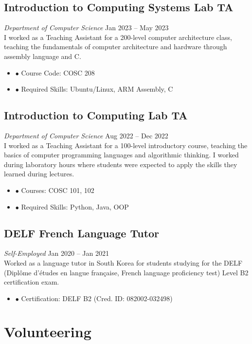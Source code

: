 \documentclass[11pt, letterpaper]{article}
\newenvironment{nitemize}{%
  \begin{itemize}[label={},topsep=0pt,itemsep=0pt,parsep=0pt,leftmargin=*]%
}{%
  \end{itemize}%
}
\begin{document}
\begin{multicols}{2}
\subsection{Introduction to Computing Systems Lab TA}
\noindent \emph{Department of Computer Science} \hfill Jan 2023 – May 2023\\
I worked as a Teaching Assistant for a 200-level computer architecture class, teaching the fundamentals of computer architecture and hardware through assembly language and C.
\begin{nitemize}
    \item \(\bullet\) Course Code: COSC 208
    \item \(\bullet\) Required Skills: Ubuntu/Linux, ARM Assembly, C
\end{nitemize}
\subsection{Introduction to Computing Lab TA}
\noindent \emph{Department of Computer Science} \hfill Aug 2022 – Dec 2022\\
I worked as a Teaching Assistant for a 100-level introductory course, teaching the basics of computer programming languages and algorithmic thinking. I worked during laboratory hours where students were expected to apply the skills they learned during lectures.
\begin{nitemize}
    \item \(\bullet\) Courses: COSC 101, 102
    \item \(\bullet\) Required Skills: Python, Java, OOP
\end{nitemize}

\subsection{DELF French Language Tutor}
\noindent \emph{Self-Employed} \hfill Jan 2020 – Jan 2021\\
Worked as a language tutor in South Korea for students studying for the DELF (Diplôme d’études en langue française, French language proficiency test) Level B2 certification exam.
\begin{nitemize}
    \item \(\bullet\) Certification: DELF B2 (Cred. ID: 082002-032498)
\end{nitemize}

\section{Volunteering}

\end{multicols}
\end{document}
